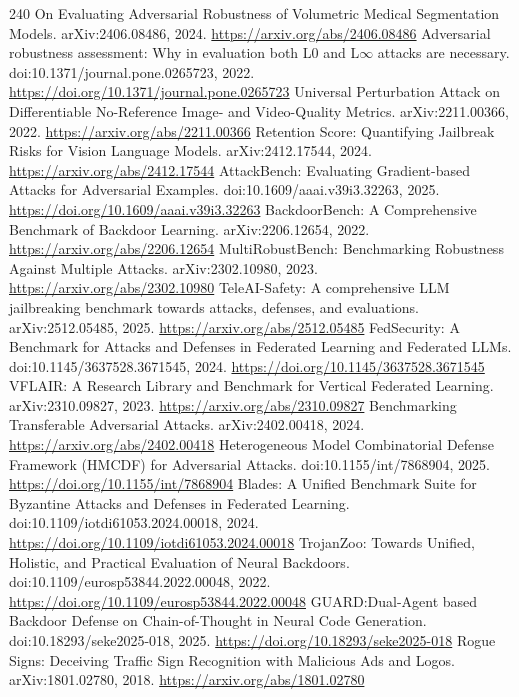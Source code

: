 \documentclass[11pt]{article}
\begin{document}
\begin{thebibliography}{240}
 On Evaluating Adversarial Robustness of Volumetric Medical Segmentation Models. arXiv:2406.08486, 2024. \url{https://arxiv.org/abs/2406.08486}
 Adversarial robustness assessment: Why in evaluation both L0 and L$\infty$ attacks are necessary. doi:10.1371/journal.pone.0265723, 2022. \url{https://doi.org/10.1371/journal.pone.0265723}
 Universal Perturbation Attack on Differentiable No-Reference Image- and Video-Quality Metrics. arXiv:2211.00366, 2022. \url{https://arxiv.org/abs/2211.00366}
 Retention Score: Quantifying Jailbreak Risks for Vision Language Models. arXiv:2412.17544, 2024. \url{https://arxiv.org/abs/2412.17544}
 AttackBench: Evaluating Gradient-based Attacks for Adversarial Examples. doi:10.1609/aaai.v39i3.32263, 2025. \url{https://doi.org/10.1609/aaai.v39i3.32263}
 BackdoorBench: A Comprehensive Benchmark of Backdoor Learning. arXiv:2206.12654, 2022. \url{https://arxiv.org/abs/2206.12654}
 MultiRobustBench: Benchmarking Robustness Against Multiple Attacks. arXiv:2302.10980, 2023. \url{https://arxiv.org/abs/2302.10980}
 TeleAI-Safety: A comprehensive LLM jailbreaking benchmark towards attacks, defenses, and evaluations. arXiv:2512.05485, 2025. \url{https://arxiv.org/abs/2512.05485}
 FedSecurity: A Benchmark for Attacks and Defenses in Federated Learning and Federated LLMs. doi:10.1145/3637528.3671545, 2024. \url{https://doi.org/10.1145/3637528.3671545}
 VFLAIR: A Research Library and Benchmark for Vertical Federated Learning. arXiv:2310.09827, 2023. \url{https://arxiv.org/abs/2310.09827}
 Benchmarking Transferable Adversarial Attacks. arXiv:2402.00418, 2024. \url{https://arxiv.org/abs/2402.00418}
 Heterogeneous Model Combinatorial Defense Framework (HMCDF) for Adversarial Attacks. doi:10.1155/int/7868904, 2025. \url{https://doi.org/10.1155/int/7868904}
 Blades: A Unified Benchmark Suite for Byzantine Attacks and Defenses in Federated Learning. doi:10.1109/iotdi61053.2024.00018, 2024. \url{https://doi.org/10.1109/iotdi61053.2024.00018}
 TrojanZoo: Towards Unified, Holistic, and Practical Evaluation of Neural Backdoors. doi:10.1109/eurosp53844.2022.00048, 2022. \url{https://doi.org/10.1109/eurosp53844.2022.00048}
 GUARD:Dual-Agent based Backdoor Defense on Chain-of-Thought in Neural Code Generation. doi:10.18293/seke2025-018, 2025. \url{https://doi.org/10.18293/seke2025-018}
 Rogue Signs: Deceiving Traffic Sign Recognition with Malicious Ads and Logos. arXiv:1801.02780, 2018. \url{https://arxiv.org/abs/1801.02780}

\end{thebibliography}
\end{document}
